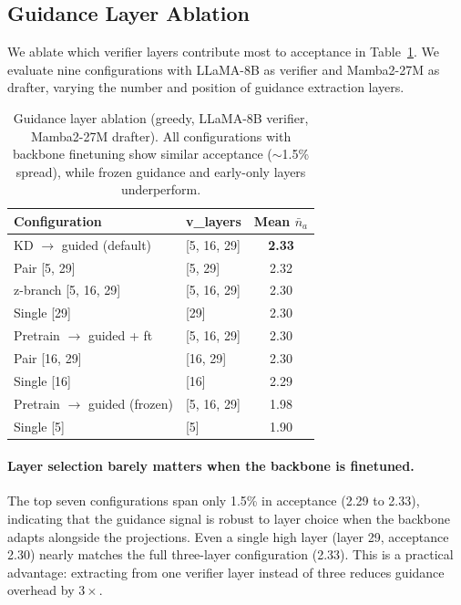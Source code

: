 \subsection{Guidance Layer Ablation}
\label{sec:layer_ablation}

We ablate which verifier layers contribute most to acceptance in Table~\ref{tab:layer_ablation}.
We evaluate nine configurations with LLaMA-8B as verifier and Mamba2-27M as drafter, varying the number and position of guidance extraction layers.

\begin{table}[t]
\centering
\caption{Guidance layer ablation (greedy, LLaMA-8B verifier, Mamba2-27M drafter). All configurations with backbone finetuning show similar acceptance ($\sim$1.5\% spread), while frozen guidance and early-only layers underperform.}
\label{tab:layer_ablation}
\vspace{0.5em}
\begin{tabular}{@{}llc@{}}
\toprule
\textbf{Configuration} & \textbf{v\_layers} & \textbf{Mean $\bar{n}_a$} \\
\midrule
KD $\to$ guided (default)     & [5, 16, 29] & \textbf{2.33} \\
Pair [5, 29]                   & [5, 29]     & 2.32 \\
z-branch [5, 16, 29]          & [5, 16, 29] & 2.30 \\
Single [29]                   & [29]        & 2.30 \\
Pretrain $\to$ guided + ft    & [5, 16, 29] & 2.30 \\
Pair [16, 29]                  & [16, 29]    & 2.30 \\
Single [16]                   & [16]        & 2.29 \\
\midrule
Pretrain $\to$ guided (frozen) & [5, 16, 29] & 1.98 \\
Single [5]                    & [5]         & 1.90 \\
\bottomrule
\end{tabular}
\end{table}

\paragraph{Layer selection barely matters when the backbone is finetuned.}
The top seven configurations span only 1.5\% in acceptance (2.29 to 2.33), indicating that the guidance signal is robust to layer choice when the backbone adapts alongside the projections.
Even a single high layer (layer 29, acceptance 2.30) nearly matches the full three-layer configuration (2.33).
This is a practical advantage: extracting from one verifier layer instead of three reduces guidance overhead by $3\times$.


